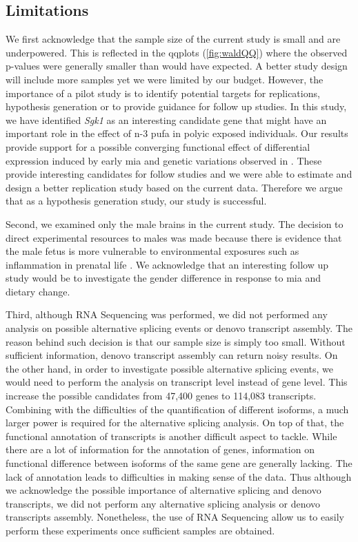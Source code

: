 \subsection{Limitations}
We first acknowledge that the sample size of the current study is small and are underpowered.
This is reflected in the \glspl{qqplot} (\cref{fig:waldQQ}) where the observed p-values were generally smaller than would have expected.
A better study design will include more samples yet we were limited by our budget.
However, the importance of a pilot study is to identify potential targets for replications, hypothesis generation or to provide guidance for follow up studies. 
In this study, we have identified \textit{Sgk1} as an interesting candidate gene that might have an important role in the effect of n-3 \gls{pufa} in \gls{polyic} exposed individuals.
Our results provide support for a possible converging functional effect of differential expression induced by early \gls{mia} and genetic variations observed in .
These provide interesting candidates for follow studies and we were able to estimate and design a better replication study based on the current data. 
Therefore we argue that as a hypothesis generation study, our study is successful.

Second, we examined only the male brains in the current study. 
The decision to direct experimental resources to males was made because there is evidence that the male fetus is more vulnerable to environmental exposures such as inflammation in prenatal life \citep{Bergeron2013,Lein2007}. 
We acknowledge that an interesting follow up study would be to investigate the gender difference in response to \gls{mia} and dietary change.

Third, although RNA Sequencing was performed, we did not performed any analysis on possible alternative splicing events or denovo transcript assembly.
The reason behind such decision is that our sample size is simply too small.
Without sufficient information, denovo transcript assembly can return noisy results.
On the other hand, in order to investigate possible alternative splicing events, we would need to perform the analysis on transcript level instead of gene level. 
This increase the possible candidates from 47,400 genes to 114,083 transcripts.
Combining with the difficulties of the quantification of different isoforms, a much larger power is required for the alternative splicing analysis. 
On top of that, the functional annotation of transcripts is another difficult aspect to tackle.
While there are a lot of information for the annotation of genes, information on functional difference between isoforms of the same gene are generally lacking. 
The lack of annotation leads to difficulties in making sense of the data. 
Thus although we acknowledge the possible importance of alternative splicing and denovo transcripts, we did not perform any alternative splicing analysis or denovo transcripts assembly.
Nonetheless, the use of RNA Sequencing allow us to easily perform these experiments once sufficient samples are obtained.

